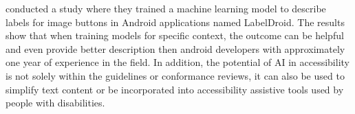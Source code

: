 \textcite{chen2020unblind} conducted a study where they trained a machine learning model to describe labels for image buttons in Android applications named LabelDroid. The results show that when training models for specific context, the outcome can be helpful and even provide better description then android developers with approximately one year of experience in the field. In addition, the potential of AI in accessibility is not solely within the guidelines or conformance reviews, it can also be used to simplify text content or be incorporated into accessibility assistive tools used by people with disabilities.

